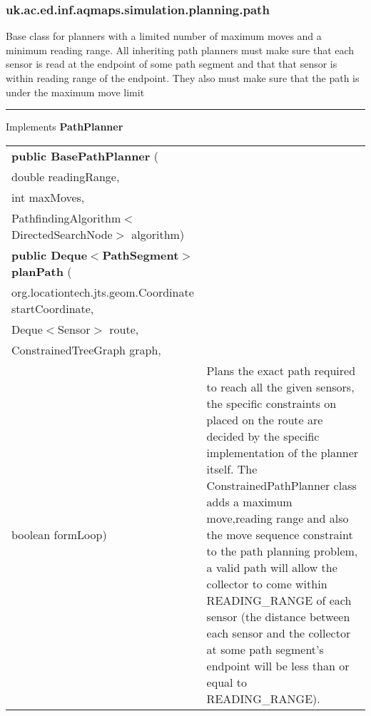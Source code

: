 \subsubsection{ uk.ac.ed.inf.aqmaps.simulation.planning.path }
 { Base class for planners with a limited number of maximum moves and a\newline%
 minimum reading range. All inheriting path planners must make sure that each sensor is read at the endpoint of some path segment\newline%
 and that that sensor is within reading range of the endpoint. They also must make sure that the path is under the maximum move limit
 
\vspace*{4pt} \hrule \vspace*{3pt}
Implements \textbf{ PathPlanner }
\begin{tabular}{ p{3in}|m{3.4in}}
\textbf{public BasePathPlanner } (\\ \hspace*{ 5pt} double readingRange,\\\hspace*{ 5pt} int maxMoves,\\\hspace*{ 5pt} PathfindingAlgorithm$<$DirectedSearchNode$>$ algorithm) & \\ \hline 
\textbf{public Deque$<$PathSegment$>$ planPath } (\\ \hspace*{ 5pt} org.locationtech.jts.geom.Coordinate startCoordinate,\\\hspace*{ 5pt} Deque$<$Sensor$>$ route,\\\hspace*{ 5pt} ConstrainedTreeGraph graph,\\\hspace*{ 5pt} boolean formLoop) & Plans the exact path required to reach all the given sensors, the specific constraints on placed on the route are decided\newline%
 by the specific implementation of the planner itself.\newline%
 The ConstrainedPathPlanner class adds a maximum move,reading range and also the move sequence constraint to the path planning problem, a valid path will allow the collector\newline%
 to come within READING\_RANGE of each sensor (the distance between each sensor and the collector at some path segment's endpoint will be less than or equal to READING\_RANGE).\newline%

\end{tabular}}
